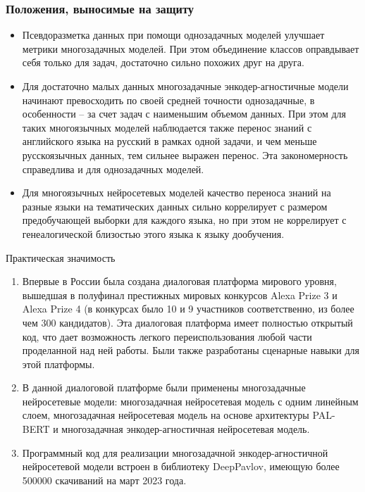 \begin{frame}
    \frametitle{Положения, выносимые на защиту}
    \begin{itemize}
  \item {Псевдоразметка данных при помощи однозадачных моделей улучшает метрики многозадачных моделей. При этом объединение классов оправдывает себя только для задач, достаточно сильно похожих друг на друга.}
  \item {Для достаточно малых данных многозадачные энкодер-агностичные модели начинают превосходить по своей средней точности однозадачные, в особенности -- за счет задач с наименьшим объемом данных. При этом для таких многоязычных моделей наблюдается также перенос знаний с английского языка на русский в рамках одной задачи, и чем меньше русскоязычных данных, тем сильнее выражен перенос. Эта закономерность справедлива и для однозадачных моделей.}
  \item {Для многоязычных нейросетевых моделей качество переноса знаний на разные языки на тематических данных сильно коррелирует с размером предобучающей выборки для каждого языка, но при этом не коррелирует с генеалогической близостью этого языка к языку дообучения.}
    \end{itemize}
\end{frame}

\begin{frame}{Практическая значимость}
\begin{enumerate}
   \item Впервые в России была создана диалоговая платформа мирового уровня, вышедшая в полуфинал престижных мировых конкурсов Alexa Prize 3 и Alexa Prize 4 (в конкурсах было 10 и 9 участников соответственно, из более чем 300 кандидатов). Эта диалоговая платформа имеет полностью открытый код, что дает возможность легкого переиспользования любой части проделанной над ней работы. Были также разработаны сценарные навыки для этой платформы.
   \item В данной диалоговой платформе были применены многозадачные нейросетевые модели: многозадачная нейросетевая модель с одним линейным слоем, многозадачная нейросетевая модель на основе архитектуры PAL-BERT и многозадачная энкодер-агностичная нейросетевая модель.
   \item Программный код для реализации многозадачной энкодер-агностичной нейросетевой модели встроен в библиотеку DeepPavlov, имеющую более 500000 скачиваний на март 2023 года.
\end{enumerate}    
\end{frame}


